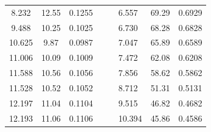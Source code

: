 \documentclass[12pt,a4paper]{article}
\begin{document}
\begin{enumerate}
\begin{table}[h!]
\begin{tabular}{ccccc|lll|}
				\multicolumn{1}{|c|}{8.232}                     & \multicolumn{1}{c|}{12.55}                    & \multicolumn{1}{c|}{0.1255}    &  &  & \multicolumn{1}{l|}{6.557}                     & \multicolumn{1}{l|}{69.29}                    & 0.6929                         \\ \cline{1-3} \cline{6-8} 
				\multicolumn{1}{|c|}{9.488}                     & \multicolumn{1}{c|}{10.25}                    & \multicolumn{1}{c|}{0.1025}    &  &  & \multicolumn{1}{l|}{6.730}                      & \multicolumn{1}{l|}{68.28}                    & 0.6828                         \\ \cline{1-3} \cline{6-8} 
				\multicolumn{1}{|c|}{10.625}                    & \multicolumn{1}{c|}{9.87}                     & \multicolumn{1}{c|}{0.0987}    &  &  & \multicolumn{1}{l|}{7.047}                     & \multicolumn{1}{l|}{65.89}                    & 0.6589                         \\ \cline{1-3} \cline{6-8} 
				\multicolumn{1}{|c|}{11.006}                    & \multicolumn{1}{c|}{10.09}                    & \multicolumn{1}{c|}{0.1009}    &  &  & \multicolumn{1}{l|}{7.472}                     & \multicolumn{1}{l|}{62.08}                    & 0.6208                         \\ \cline{1-3} \cline{6-8} 
				\multicolumn{1}{|c|}{11.588}                    & \multicolumn{1}{c|}{10.56}                    & \multicolumn{1}{c|}{0.1056}    &  &  & \multicolumn{1}{l|}{7.856}                     & \multicolumn{1}{l|}{58.62}                    & 0.5862                         \\ \cline{1-3} \cline{6-8} 
				\multicolumn{1}{|c|}{11.528}                    & \multicolumn{1}{c|}{10.52}                    & \multicolumn{1}{c|}{0.1052}    &  &  & \multicolumn{1}{l|}{8.712}                     & \multicolumn{1}{l|}{51.31}                    & 0.5131                         \\ \cline{1-3} \cline{6-8} 
				\multicolumn{1}{|c|}{12.197}                    & \multicolumn{1}{c|}{11.04}                    & \multicolumn{1}{c|}{0.1104}    &  &  & \multicolumn{1}{l|}{9.515}                     & \multicolumn{1}{l|}{46.82}                    & 0.4682                         \\ \cline{1-3} \cline{6-8} 
				\multicolumn{1}{|c|}{12.193}                    & \multicolumn{1}{c|}{11.06}                    & \multicolumn{1}{c|}{0.1106}    &  &  & \multicolumn{1}{l|}{10.394}                    & \multicolumn{1}{l|}{45.86}                    & 0.4586                         \\ \cline{1-3} \cline{6-8} 

\end{tabular}
\end{table}
\end{enumerate}
\end{document}
